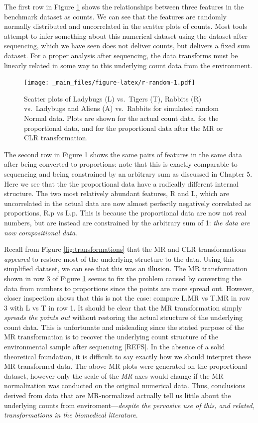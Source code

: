 \documentclass[onecolumn]{book}
\theoremstyle{definition}
\theoremstyle{definition}
\theoremstyle{definition}
\theoremstyle{remark}
\begin{document}
The first row in Figure \ref{fig:r-random} shows the relationships
between three features in the benchmark dataset as counts. We can see
that the features are randomly normally distributed and uncorrelated in
the scatter plots of counts. Most tools attempt to infer something about
this numerical dataset using the dataset after sequencing, which we have
seen does not deliver counts, but delivers a fixed sum dataset. For a
proper analysis after sequencing, the data transforms must be linearly
related in some way to this underlying count data from the environment.

\begin{figure}
\centering
\texttt{[image: \_main\_files/figure-latex/r-random-1.pdf]}
\caption{\label{fig:r-random}Scatter plots of Ladybugs (L) vs.~Tigers (T),
Rabbits (R) vs.~Ladybugs and Aliens (A) vs.~Rabbits for simulated random
Normal data. Plots are shown for the actual count data, for the
proportional data, and for the proportional data after the MR or CLR
transformation.}
\end{figure}

The second row in Figure \ref{fig:r-random} shows the same pairs of
features in the same data after being converted to proportions: note
that this is exactly comparable to sequencing and being constrained by
an arbitrary sum as discussed in Chapter 5. Here we see that the the
proportional data have a radically different internal structure. The two
most relatively abundant features, R and L, which are uncorrelated in
the actual data are now almost perfectly negatively correlated as
proportions, R.p vs L.p. This is because the proportional data are now
not real numbers, but are instead are constrained by the arbitrary sum
of 1: \emph{the data are now compositional data}.

Recall from Figure \ref{fig:transformations} that the MR and CLR
transformations \emph{appeared} to restore most of the underlying
structure to the data. Using this simplified dataset, we can see that
this was an illusion. The MR transformation shown in row 3 of Figure
\ref{fig:r-random} seems to fix the problem caused by converting the
data from numbers to proportions since the points are more spread out.
However, closer inspection shows that this is not the case: compare L.MR
vs T.MR in row 3 with L vs T in row 1. It should be clear that the MR
transformation simply \emph{spreads the points out} without restoring
the actual structure of the underlying count data. This is unfortunate
and misleading since the stated purpose of the MR transformation is to
recover the underlying count structure of the environmental sample after
sequencing {[}REFS{]}. In the absence of a solid theoretical foundation,
it is difficult to say exactly how we should interpret these
MR-transformed data. The above MR plots were generated on the
proportional dataset, however only the scale of the \emph{MR} axes would
change if the MR normalization was conducted on the original numerical
data. Thus, conclusions derived from data that are MR-normalized
actually tell us little about the underlying counts from
enviroment---\emph{despite the pervasive use of this, and related, transformations in the biomedical literature}.
\end{document}
